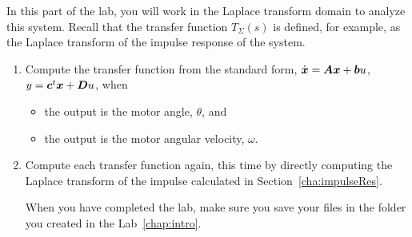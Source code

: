 In this part of the lab, you will work in the Laplace transform domain to
analyze this system. Recall that the transfer function $T_{\Sigma}(s)$ is
defined, for example, as the Laplace transform of the impulse response of the
system.
\begin{enumerate}
\item Compute the transfer function from the
standard form, $\dot{\boldsymbol{x}}=\boldsymbol{A}\boldsymbol{x}+\boldsymbol{b}u$, $y=\boldsymbol{c}^t\boldsymbol{x}+\boldsymbol{D}u$\@, when
\begin{itemize}
\item the output is the motor angle, $\theta$\@, and
\item the output is the motor angular velocity, $\omega$\@.
\end{itemize}

\item Compute each transfer function again, this time by directly computing
the Laplace transform of the impulse calculated in
Section~\ref{cha:impulseRes}\@.

When you have completed the lab, make sure you save your files in the folder
you created in the Lab~\ref{chap:intro}\@.
\end{enumerate}

